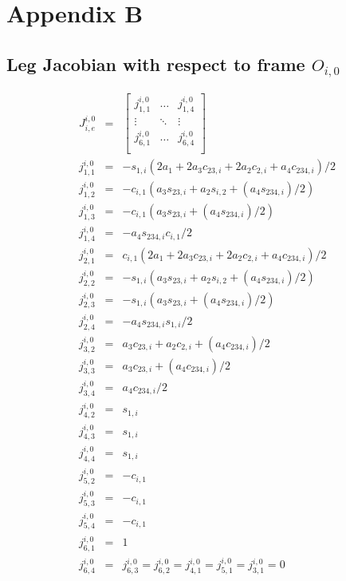 \chapter*{Appendix B}
	\section*{Leg Jacobian with respect to frame $O_{i,0}$}
	\begin{eqnarray*}
		J^{i,0}_{i,e} &=& 
		\left[
			\begin{array}{ccc}
				j_{1,1}^{i,0}	& \ldots 		& j_{1,4}^{i,0} 	\\
				\vdots 			& \ddots 		& \vdots 			\\
				j_{6,1}^{i,0}	& \ldots 	 	& j_{6,4}^{i,0} 	\\
			\end{array}
		\right]\\
		j_{1,1}^{i,0} &=& -s_{1,i} (2 a_{1} + 2 a_{3} c_{23,i} + 2 a_{2} c_{2,i} + a_{4} c_{234,i})/2\nonumber\\
		j_{1,2}^{i,0} &=& -c_{i,1} (a_{3} s_{23,i} + a_{2} s_{i,2} + (a_{4} s_{234,i})/2)				\nonumber\\
		j_{1,3}^{i,0} &=& -c_{i,1} (a_{3} s_{23,i} + (a_{4} s_{234,i})/2)								\nonumber\\
		j_{1,4}^{i,0} &=& -a_{4} s_{234,i} c_{i,1}/2 												\nonumber\\
		j_{2,1}^{i,0} &=& c_{i,1} (2 a_{1} + 2 a_{3} c_{23,i} + 2 a_{2} c_{2,i} + a_{4} c_{234,i})/2\nonumber\\
		j_{2,2}^{i,0} &=& -s_{1,i} (a_{3} s_{23,i} + a_{2} s_{i,2} + (a_{4} s_{234,i})/2)				\nonumber\\
		j_{2,3}^{i,0} &=& -s_{1,i} (a_{3} s_{23,i} + (a_{4} s_{234,i})/2)								\nonumber\\
		j_{2,4}^{i,0} &=& -a_{4} s_{234,i} s_{1,i}/2 												\nonumber\\
		j_{3,2}^{i,0} &=& a_{3} c_{23,i} + a_{2} c_{2,i} + (a_{4} c_{234,i})/2						\nonumber\\
		j_{3,3}^{i,0} &=& a_{3} c_{23,i} + (a_{4} c_{234,i})/2										\nonumber\\
		j_{3,4}^{i,0} &=& a_{4} c_{234,i}/2 														\nonumber\\
		j_{4,2}^{i,0} &=& s_{1,i}																		\nonumber\\
		j_{4,3}^{i,0} &=& s_{1,i}																		\nonumber\\
		j_{4,4}^{i,0} &=& s_{1,i}																		\nonumber\\
		j_{5,2}^{i,0} &=& -c_{i,1}																	\nonumber\\
		j_{5,3}^{i,0} &=& -c_{i,1}																	\nonumber\\
		j_{5,4}^{i,0} &=& -c_{i,1}																	\nonumber\\
		j_{6,1}^{i,0} &=& 1																			\nonumber\\
		j_{6,4}^{i,0} &=& j_{6,3}^{i,0} = j_{6,2}^{i,0} = j_{4,1}^{i,0} = j_{5,1}^{i,0} = j_{3,1}^{i,0} = 0															\nonumber\\
		\label{eq::leg_jacobian}
	\end{eqnarray*}